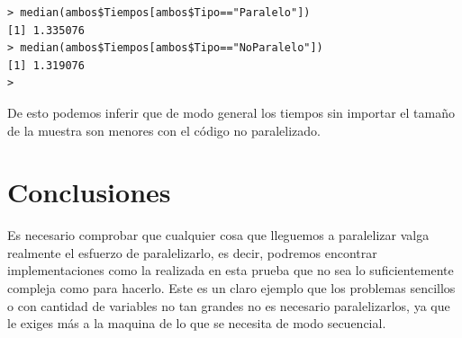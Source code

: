 \documentclass[a4paper]{article}
\begin{document}
\begin{lstlisting}[frame=single]
> median(ambos$Tiempos[ambos$Tipo=="Paralelo"])
[1] 1.335076
> median(ambos$Tiempos[ambos$Tipo=="NoParalelo"])
[1] 1.319076
> 
\end{lstlisting}

De esto podemos inferir que de modo general los tiempos sin importar el tamaño de la muestra son menores con el código no paralelizado. 

\section{Conclusiones}
Es necesario comprobar que cualquier cosa que lleguemos a paralelizar valga realmente el esfuerzo de paralelizarlo, es decir, podremos encontrar implementaciones como la realizada en esta prueba que no sea lo suficientemente compleja como para hacerlo. Este es un claro ejemplo que los problemas sencillos o con cantidad de variables no tan grandes no es necesario paralelizarlos, ya que le exiges más a la maquina de lo que se necesita de modo secuencial.
\end{document}
